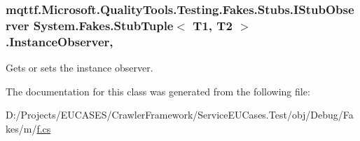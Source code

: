 \hypertarget{class_system_1_1_fakes_1_1_stub_tuple_3_01_t1_00_01_t2_01_4_a7a72f1b8d86763c048b63fd800dbe2c5}{
\subsubsection[{Instance\-Observer}]{\setlength{\rightskip}{0pt plus 5cm}mqttf.\-Microsoft.\-Quality\-Tools.\-Testing.\-Fakes.\-Stubs.\-I\-Stub\-Observer System.\-Fakes.\-Stub\-Tuple$<$ T1, T2 $>$.Instance\-Observer\hspace{0.3cm}{\ttfamily [get]}, {\ttfamily [set]}}}\label{class_system_1_1_fakes_1_1_stub_tuple_3_01_t1_00_01_t2_01_4_a7a72f1b8d86763c048b63fd800dbe2c5}


Gets or sets the instance observer.



The documentation for this class was generated from the following file\-:\begin{DoxyCompactItemize}
\item 
D\-:/\-Projects/\-E\-U\-C\-A\-S\-E\-S/\-Crawler\-Framework/\-Service\-E\-U\-Cases.\-Test/obj/\-Debug/\-Fakes/m/\hyperlink{m_2f_8cs}{f.\-cs}\end{DoxyCompactItemize}
